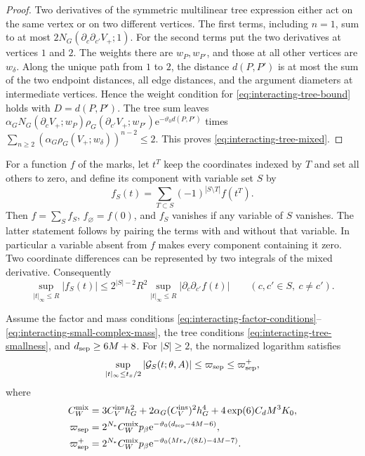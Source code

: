 \documentclass[11pt,letterpaper,reqno]{amsart}
\begin{document}
\begin{proof}
Two derivatives of the symmetric multilinear
tree expression either act on the same vertex
or on two different vertices. The first
terms, including $n=1$, sum to at most
$2N_G(\partial_c\partial_{c'}V_+;1)$.
For the second terms put the two derivatives
at vertices $1$ and $2$. The weights there
are $w_P,w_{P'}$, and those at all other
vertices are $w_\delta$.
Along the unique path from $1$ to $2$,
the distance $d(P,P')$ is at most the
sum of the two endpoint distances, all
edge distances, and the argument diameters
at intermediate vertices. Hence the weight
condition for \eqref{eq:interacting-tree-bound}
holds with $D=d(P,P')$. The tree sum leaves
$\alpha_GN_G(\partial_cV_+;w_P)
\rho_G(\partial_{c'}V_+;w_{P'})
\mathrm e^{-\vartheta_0d(P,P')}$ times
$\sum_{n\ge2}(\alpha_G\rho_G(V_+;w_\delta))^{n-2}\le2$.
This proves \eqref{eq:interacting-tree-mixed}.
\end{proof}

For a function $f$ of the marks, let
$t^T$ keep the coordinates indexed by $T$
and set all others to zero, and define
its component with variable set $S$ by
\[
 f_S(t)=\sum_{T\subset S}(-1)^{|S\setminus T|}f(t^T).
\]
Then $f=\sum_Sf_S$, $f_\varnothing=f(0)$,
and $f_S$ vanishes if any variable of $S$
vanishes. The latter statement follows by
pairing the terms with and without that
variable. In particular a variable absent
from $f$ makes every component containing
it zero. Two coordinate differences can
be represented by two integrals of the
mixed derivative. Consequently
\begin{equation}\label{eq:interacting-Mobius-bound}
 \sup_{|t|_\infty\le R}|f_S(t)|
 \le2^{|S|-2}R^2
          \sup_{|t|_\infty\le R}|\partial_c\partial_{c'}f(t)|
 \qquad(c,c'\in S,\ c\ne c').
\end{equation}

\begin{proposition}\label{prop:interacting-mixed-logarithm}
Assume the factor and mass conditions
\eqref{eq:interacting-factor-conditions}--\eqref{eq:interacting-small-complex-mass},
the tree conditions \eqref{eq:interacting-tree-smallness}, and
$d_{\rm sep}\ge6M+8$. For $|S|\ge2$, the normalized logarithm satisfies
\begin{equation}\label{eq:interacting-mixed-logarithm}
 \sup_{|t|_\infty\le t_x/2}|\mathcal G_S(t;\theta,A)|
                     \le\varpi_{\rm sep}\le\varpi_{\rm sep}^+,
\end{equation}
where
\begin{align}
 C_W^{\mathrm{mix}}&=3C_V^{\mathrm{ins}}h_G^2+2\alpha_G(C_V^{\mathrm{ins}})^2h_G^4
                             +4\exp(6)C_dM^3K_0,\notag\\
 \varpi_{\rm sep}&=2^{N_*}C_W^{\mathrm{mix}}p_\beta
                    \mathrm e^{-\vartheta_0(d_{\rm sep}-4M-6)},\notag\\
 \varpi_{\rm sep}^+&=2^{N_*}C_W^{\mathrm{mix}}p_\beta
                    \mathrm e^{-\vartheta_0(Mr_*/(8L)-4M-7)} .
                                  \label{eq:interacting-separation-errors}
\end{align}
\end{proposition}
\end{document}
